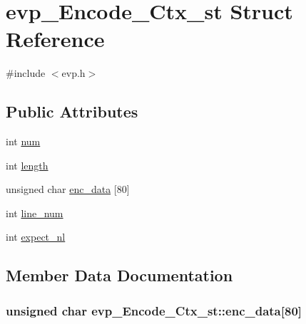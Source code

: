 \hypertarget{structevp___encode___ctx__st}{}\section{evp\+\_\+\+Encode\+\_\+\+Ctx\+\_\+st Struct Reference}
\label{structevp___encode___ctx__st}


{\ttfamily \#include $<$evp.\+h$>$}

\subsection*{Public Attributes}
\begin{DoxyCompactItemize}
\item 
int \hyperlink{structevp___encode___ctx__st_a7a68545e6131f26113bc316cb66e794d}{num}
\item 
int \hyperlink{structevp___encode___ctx__st_ab5409ce49d7af9d0320f5bd1c9bbdfd4}{length}
\item 
unsigned char \hyperlink{structevp___encode___ctx__st_ab2465a57d3ee1c0d7efba8f278c81911}{enc\+\_\+data} \mbox{[}80\mbox{]}
\item 
int \hyperlink{structevp___encode___ctx__st_a92d2880fa44acb614cff2005fe3d74e3}{line\+\_\+num}
\item 
int \hyperlink{structevp___encode___ctx__st_ae152066ba261286f7521992aefbfa952}{expect\+\_\+nl}
\end{DoxyCompactItemize}


\subsection{Member Data Documentation}
\subsubsection[{\texorpdfstring{enc\+\_\+data}{enc_data}}]{\setlength{\rightskip}{0pt plus 5cm}unsigned char evp\+\_\+\+Encode\+\_\+\+Ctx\+\_\+st\+::enc\+\_\+data\mbox{[}80\mbox{]}}\hypertarget{structevp___encode___ctx__st_ab2465a57d3ee1c0d7efba8f278c81911}{}\label{structevp___encode___ctx__st_ab2465a57d3ee1c0d7efba8f278c81911}
